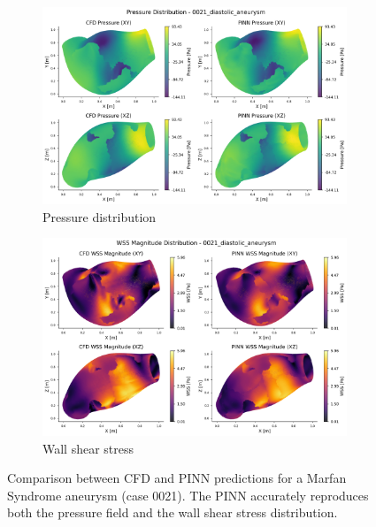 \documentclass[12pt, a4paper]{article}
\begin{document}
\begin{figure}[H]
    \centering
    \scriptsize
    \begin{subfigure}{0.9\textwidth}
        \includegraphics[width=\textwidth]{0021_diastolic_aneurysm/pressure_distribution_0021_diastolic_aneurysm.png}
        \caption{\small Pressure distribution}
    \end{subfigure}
    \begin{subfigure}{0.9\textwidth}
        \includegraphics[width=\textwidth]{0021_diastolic_aneurysm/wss_magnitude_distribution_0021_diastolic_aneurysm.png}
        \caption{\small Wall shear stress}
    \end{subfigure}
    \caption{Comparison between CFD and PINN predictions for a Marfan Syndrome aneurysm (case 0021). The PINN accurately reproduces both the pressure field and the wall shear stress distribution.}
    \label{fig:PINN_results1}
\end{figure}
\end{document}
